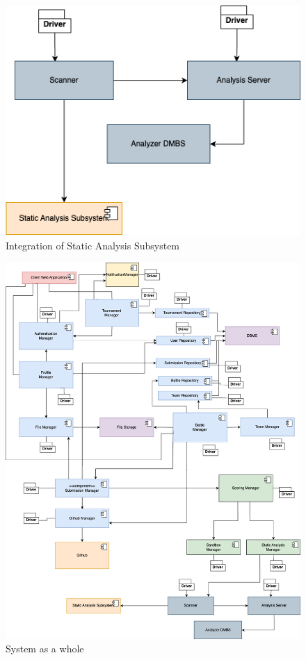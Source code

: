\begin{figure}[H]
    \centering
    \includegraphics[width=\linewidth]{Images/integration/integration_10.drawio.png}
    \caption{Integration of Static Analysis Subsystem}
\end{figure}

\newpage

\begin{figure}[H]
    \centering
    \includegraphics[width=\linewidth]{Images/integration/integration_11.drawio.png}
    \caption{System as a whole}
\end{figure}

